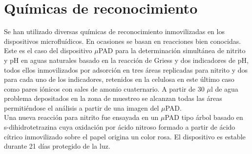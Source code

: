 \documentclass{article}
\begin{document}
\section{Químicas de reconocimiento}
Se han utilizado diversas químicas de reconocimiento inmovilizadas en los dispositivos microfluídicos. En ocasiones se basan en reacciones bien conocidas. Este es el caso del dispositivo $\mu$PAD para la determinación simultánea de nitrito y pH en aguas naturales basado en la reacción de Griess y dos indicadores de pH, todos ellos inmovilizados por adsorción en tres áreas replicadas para nitrito y dos para cada uno de los indicadores, retenidos en la celulosa en este último caso como pares iónicos con sales de amonio cuaternario. A partir de 30 $\mu$l de agua problema depositados en la zona de muestreo se alcanzan todas las áreas permitiéndose el análisis a partir de una imagen del $\mu$PAD\cite{Lopez-Ruiz2014}.\\
Una nueva reacción para nitrito fue ensayada en un $\mu$PAD tipo árbol basado en s-dihidrotetrazina cuya oxidación por ácido nitroso formado a partir de ácido cítrico inmovilizado sobre el papel origina un color rosa. El dispositivo es estable durante 21 días protegido de la luz.\\
\end{document}
